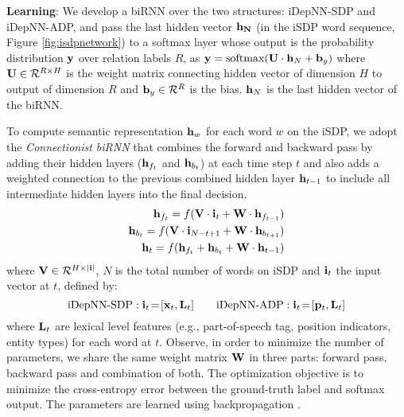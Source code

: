 \documentclass[letterpaper]{article} \usepackage{aaai19}  \usepackage{times}  \usepackage{helvet}  \usepackage{courier}  \usepackage{url}  \usepackage{graphicx}
\begin{document}
{\bf Learning}: We develop a biRNN over the two structures:
iDepNN-SDP and iDepNN-ADP, and pass the last hidden vector
$\bf h_N$ (in the iSDP word sequence,
Figure \ref{fig:isdpnetwork}) to a softmax layer whose
output is the probability distribution $\bf y$ over relation
labels $R$, as ${\bf y} = \mbox{softmax}({\bf U} \cdot {\bf h}_N +
{\bf b}_y)$ where ${\bf U} \in {\cal R}^{R \times H}$ is the weight
matrix connecting hidden vector of dimension $H$ to output
of dimension $R$ and ${\bf b}_y \in {\cal R}^R$ is the
bias. ${\bf h}_N$ is the last hidden vector of the biRNN.




To compute semantic representation ${\bf h}_w$ for each word $w$ on the iSDP, we adopt the {\it Connectionist biRNN} \cite{vu2016combining} that
combines the forward and backward pass by adding their hidden layers (${\bf h}_{{f}_{t}}$  and ${\bf h}_{{b}_{t}}$) at each time step $t$ and also adds a weighted connection to the
previous combined hidden layer $ {\bf h}_{t-1}$ to include all intermediate hidden layers into the final decision.\begin{eqnarray*}
{\bf h}_{{f}_{t}} = f({\bf V} \cdot {\bf i}_{t} + {\bf W} \cdot  {\bf h}_{{f}_{t-1}})\\
{\bf h}_{{b}_{t}} = f({\bf V} \cdot {\bf i}_{N-t+1} + {\bf W} \cdot {\bf h}_{{b}_{t+1}})\\
{\bf h}_{t} = f({\bf h}_{{f}_{t}} + {\bf h}_{{b}_{t}}+ {\bf W} \cdot {\bf h}_{t-1})
\end{eqnarray*}
where ${\bf V} \in {\cal R}^{H \times |{\bf i}|}$, $N$ is the total number of words on iSDP and ${\bf i}_t$  the input vector at  $t$, defined by:
\[ \mbox{iDepNN-SDP}: {\bf i}_t \!=\! [{\bf x}_t, {\bf
L}_t] \ \ \ \ \ \ \mbox{iDepNN-ADP}: {\bf i}_t \!=\! [{\bf p}_t, {\bf L}_t] \]
where ${\bf L}_t$ are lexical level features 
(e.g., part-of-speech  tag, position indicators, entity types) for each word at $t$.
Observe, in order to minimize the number of parameters, we share the same weight matrix ${\bf W}$ in three parts: forward pass, backward pass and combination of  both.  
The optimization objective is to minimize
the cross-entropy error between the ground-truth
label and softmax output.
The parameters
are learned using backpropagation \cite{werbos1990backpropagation}.

\end{document}
